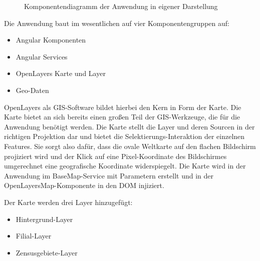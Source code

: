\begin{figure}[H]
	\caption{Komponentendiagramm der Anwendung in eigener Darstellung}
	\label{img:components_diagram}
\end{figure}

Die Anwendung baut im wesentlichen auf vier Komponentengruppen auf:

\begin{itemize}
\item Angular Komponenten
\item Angular Services
\item OpenLayers Karte und Layer
\item Geo-Daten
\end{itemize}

OpenLayers als GIS-Software bildet hierbei den Kern in Form der Karte.
Die Karte bietet an sich bereits einen großen Teil der GIS-Werkzeuge, die für die Anwendung benötigt werden.
Die Karte stellt die Layer und deren Sourcen in der richtigen Projektion dar und bietet die Selektierungs-Interaktion der einzelnen Features.
Sie sorgt also dafür, dass die ovale Weltkarte auf den flachen Bildschirm projiziert wird und der Klick auf eine Pixel-Koordinate des Bildschirmes umgerechnet eine geografische Koordinate widerspiegelt.
Die Karte wird in der Anwendung im BaseMap-Service mit Parametern erstellt und in der OpenLayersMap-Komponente in den DOM injiziert. 

Der Karte werden drei Layer hinzugefügt:

\begin{itemize}
\item Hintergrund-Layer
\item Filial-Layer
\item Zensusgebiete-Layer
\end{itemize}

